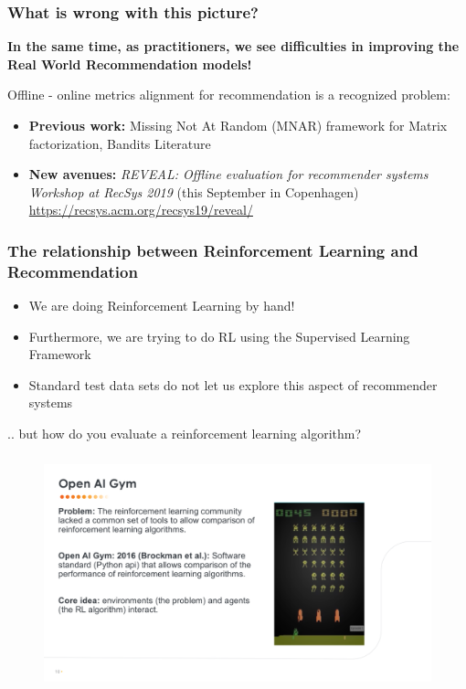\begin{frame}
  \frametitle{What is wrong with this picture?}
  
	\textbf{In the same time, as practitioners, we see difficulties in improving the Real World Recommendation models!}

	Offline - online metrics alignment for recommendation is a recognized problem:
	\begin{itemize}
	\item \textbf{Previous work:} Missing Not At Random (MNAR) framework for Matrix factorization, Bandits Literature
	\item \textbf{New avenues:}  \emph{REVEAL: Offline evaluation for recommender systems Workshop at RecSys 2019} (this September in Copenhagen) \url{https://recsys.acm.org/recsys19/reveal/}
	\end{itemize}
  
\end{frame}


\begin{frame}
  \frametitle{The relationship between Reinforcement Learning and Recommendation}

\begin{itemize}
\item We are doing Reinforcement Learning by hand!
\pause
\item Furthermore, we are trying to do RL using the Supervised Learning Framework
\pause
\item Standard test data sets do not let us explore this aspect of recommender systems
\end{itemize}

\pause
.. but how do you evaluate a reinforcement learning algorithm?
\end{frame}

  



\begin{frame}
  \frametitle{}
 
 
   \begin{figure}[h!]
     \includegraphics[scale=0.39]{images/openai.png}
       \centering
       \label{motex1}
   \end{figure}
     
 \end{frame}



